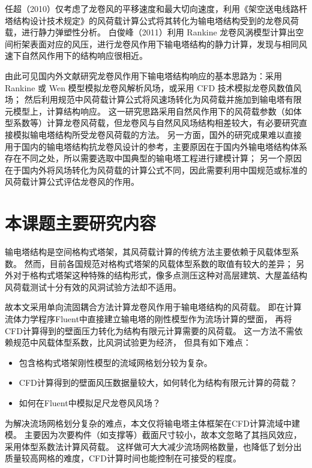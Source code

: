 任超（2010）\cite{ren2010tower}仅考虑了龙卷风的平移速度和最大切向速度，利用《架空送电线路杆塔结构设计技术规定》的风荷载计算公式将其转化为输电塔结构受到的龙卷风荷载，进行静力弹塑性分析。
白俊峰（2011）\cite{bai2011tornado}利用 Rankine 龙卷风涡模型计算出空间桁架表面对应的风压，进行龙卷风作用下输电塔结构的静力计算，发现与相同风速下自然风作用下的结构响应很相近。

由此可见国内外文献研究龙卷风作用下输电塔结构响应的基本思路为：采用 Rankine 或 Wen 模型模拟龙卷风解析风场，或采用 CFD 技术模拟龙卷风数值风场；
然后利用规范中风荷载计算公式将风速场转化为风荷载并施加到输电塔有限元模型上，计算结构响应。
这一研究思路采用自然风作用下的风荷载参数（如体型系数等）计算龙卷风荷载，但龙卷风与自然风风场结构相差较大，有必要研究直接模拟输电塔结构所受龙卷风荷载的方法。
另一方面，国外的研究成果难以直接用于国内的输电塔结构抗龙卷风设计的参考，主要原因在于国内外输电塔结构体系存在不同之处，所以需要选取中国典型的输电塔工程进行建模计算；
另一个原因在于国内外将风场转化为风荷载的计算公式不同，因此需要利用中国规范或标准的风荷载计算公式评估龙卷风的作用。


\section{本课题主要研究内容}

输电塔结构是空间格构式塔架，其风荷载计算的传统方法主要依赖于风载体型系数。
然而，目前各国规范对格构式塔架的风载体型系数的取值有较大的差异；
另外对于格构式塔架这种特殊的结构形式，像多点测压这种对高层建筑、大屋盖结构风荷载测试十分有效的风洞试验方法却不适用。

故本文采用单向流固耦合方法计算龙卷风作用于输电塔结构的风荷载。
即在计算流体力学程序Fluent中直接建立输电塔的刚性模型作为流场计算的壁面，
再将CFD计算得到的壁面压力转化为结构有限元计算需要的风荷载。
这一方法不需依赖规范中风载体型系数，比风洞试验更为经济，
但具有如下难点：

\begin{itemize}
  \item 包含格构式塔架刚性模型的流域网格划分较为复杂。
  \item CFD计算得到的壁面风压数据量较大，如何转化为结构有限元计算的荷载？
  \item 如何在Fluent中模拟足尺龙卷风风场？
\end{itemize}

为解决流场网格划分复杂的难点，本文仅将输电塔主体框架在CFD计算流域中建模。
主要因为次要构件（如支撑等）截面尺寸较小，故本文忽略了其挡风效应，采用体型系数法计算风荷载。
这样做可大大减少流场网格数量，也降低了划分出质量较高网格的难度，CFD计算时间也能控制在可接受的程度。

